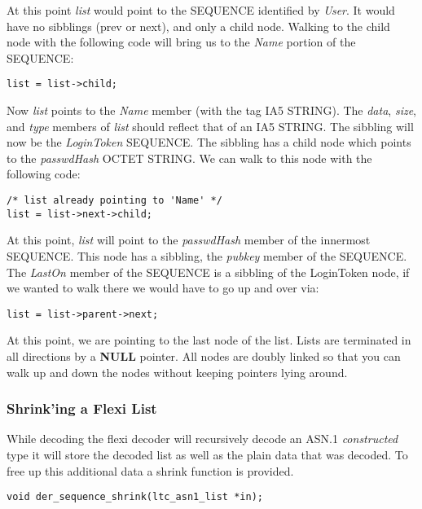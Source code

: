 \documentclass[synpaper]{book}
\begin{document}
At this point \textit{list} would point to the SEQUENCE identified by \textit{User}.  It would have no sibblings (prev or next), and only a child node.  Walking to the child
node with the following code will bring us to the \textit{Name} portion of the SEQUENCE:
\begin{small}
\begin{verbatim}
list = list->child;
\end{verbatim}
\end{small}
Now \textit{list} points to the \textit{Name} member (with the tag IA5 STRING).  The \textit{data}, \textit{size}, and \textit{type} members of \textit{list} should reflect
that of an IA5 STRING.  The sibbling will now be the \textit{LoginToken} SEQUENCE.  The sibbling has a child node which points to the \textit{passwdHash} OCTET STRING.
We can walk to this node with the following code:
\begin{small}
\begin{verbatim}
/* list already pointing to 'Name' */
list = list->next->child;
\end{verbatim}
\end{small}
At this point, \textit{list} will point to the \textit{passwdHash} member of the innermost SEQUENCE.  This node has a sibbling, the \textit{pubkey} member of the SEQUENCE.
The \textit{LastOn} member of the SEQUENCE is a sibbling of the LoginToken node, if we wanted to walk there we would have to go up and over via:
\begin{small}
\begin{verbatim}
list = list->parent->next;
\end{verbatim}
\end{small}
At this point, we are pointing to the last node of the list.  Lists are terminated in all directions by a \textbf{NULL} pointer.  All nodes are doubly linked so that you
can walk up and down the nodes without keeping pointers lying around.


\subsubsection{Shrink'ing a Flexi List}
While decoding the flexi decoder will recursively decode an ASN.1 \textit{constructed} type it will store the decoded list
as well as the plain data that was decoded.
To free up this additional data a shrink function is provided.

\begin{verbatim}
void der_sequence_shrink(ltc_asn1_list *in);
\end{verbatim}
\end{document}

